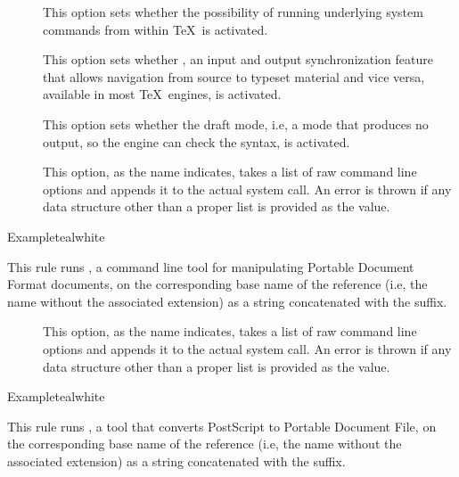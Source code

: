 \begin{description}
\begin{description}
\item[] This option sets whether the possibility of running underlying system commands from within \TeX\ is activated.

\item[] This option sets whether , an input and output synchronization feature that allows navigation from source to typeset material and vice versa, available in most \TeX\ engines, is activated.

\item[] This option sets whether the draft mode, i.e, a mode that produces no output, so the engine can check the syntax, is activated.

\item[] This option, as the name indicates, takes a list of raw command line options and appends it to the actual system call. An error is thrown if any data structure other than a proper list is provided as the value.
\end{description}

\begin{codebox}{Example}{teal}{\icnote}{white}
\end{codebox}

\item[\rulebox{pdftk}{Nicola Talbot, Paulo Cereda}] This rule runs , a command line tool for manipulating Portable Document Format documents, on the corresponding base name of the  reference (i.e, the name without the associated extension) as a string concatenated with the  suffix.

\begin{description}
\item[] This option, as the name indicates, takes a list of raw command line options and appends it to the actual system call. An error is thrown if any data structure other than a proper list is provided as the value.
\end{description}

\begin{codebox}{Example}{teal}{\icnote}{white}
\end{codebox}

\item[\rulebox{ps2pdf}{Marco Daniel, Paulo Cereda}] This rule runs , a tool that converts PostScript to Portable Document File, on the corresponding base name of the  reference (i.e, the name without the associated extension) as a string concatenated with the  suffix.


\end{description}
